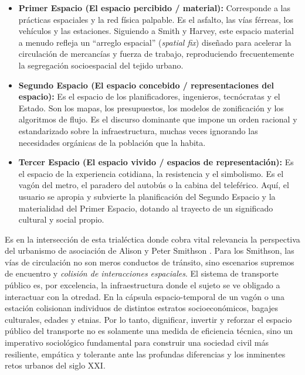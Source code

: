 \begin{itemize}
    \item \textbf{Primer Espacio (El espacio percibido / material):} Corresponde a las 
            prácticas espaciales y la red física palpable. Es el asfalto, las vías férreas, 
            los vehículos y las estaciones. Siguiendo a Smith y Harvey, este espacio material 
            a menudo refleja un ``arreglo espacial'' (\textit{spatial fix}) diseñado para 
            acelerar la circulación de mercancías y fuerza de trabajo, reproduciendo 
            frecuentemente la segregación socioespacial del tejido urbano.
    
    \item \textbf{Segundo Espacio (El espacio concebido / representaciones del espacio):} Es 
            el espacio de los planificadores, ingenieros, tecnócratas y el Estado. Son los mapas, 
            los presupuestos, los modelos de zonificación y los algoritmos de flujo. Es el 
            discurso dominante que impone un orden racional y estandarizado sobre la infraestructura, 
            muchas veces ignorando las necesidades orgánicas de la población que la habita.
    
    \item \textbf{Tercer Espacio (El espacio vivido / espacios de representación):} Es el espacio 
            de la experiencia cotidiana, la resistencia y el simbolismo. Es el vagón del metro, 
            el paradero del autobús o la cabina del teleférico. Aquí, el usuario se apropia y 
            subvierte la planificación del Segundo Espacio y la materialidad del Primer Espacio, 
            dotando al trayecto de un significado cultural y social propio.
\end{itemize}

Es en la intersección de esta trialéctica donde cobra vital relevancia la perspectiva del urbanismo 
de asociación de Alison y Peter Smithson \cite{smithson1967urban}. Para los Smithson, las vías 
de circulación no son meros conductos de tránsito, sino escenarios supremos de encuentro 
y \textit{colisión de interacciones espaciales}. El sistema de transporte público es, por 
excelencia, la infraestructura donde el sujeto se ve obligado a interactuar con la otredad. 
En la cápsula espacio-temporal de un vagón o una estación colisionan individuos de distintos 
estratos socioeconómicos, bagajes culturales, edades y etnias. Por lo tanto, dignificar, invertir 
y reforzar el espacio público del transporte no es solamente una medida de eficiencia técnica, sino 
un imperativo sociológico fundamental para construir una sociedad civil más resiliente, empática 
y tolerante ante las profundas diferencias y los inminentes retos urbanos del siglo XXI.

